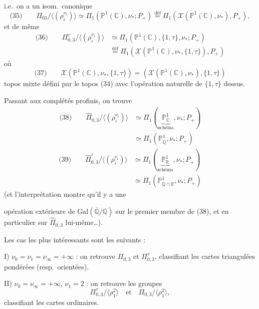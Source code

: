 \documentclass[11pt,a4paper]{article}
\begin{document}
i.e.\ on a un isom.\ canonique
\[
  \text{(35)} \qquad \Pi_{03} / \langle (\rho_i^{\nu_i}) \rangle \simeq
  \Pi_1(\mathbb{P}^1(\mathbb{C}), \nu_*; P_+) \overset{\text{déf}}{=}
  \Pi_1(\mathcal{X}(\mathbb{P}^1(\mathbb{C}), \nu_*), P_+) ,
\]
et de même
\[
  \begin{aligned}
  \text{(36)} \qquad \Pi_{0,3}^\tau / \langle (\rho_i^{\nu_i}) \rangle
  &\simeq \Pi_1(\mathbb{P}^1(\mathbb{C}), \{1, \tau\}, \nu_*; P_+) \\
  &\overset{\text{déf}}{=}
  \Pi_1(\mathcal{X}(\mathbb{P}^1(\mathbb{C}), \nu_*, \{1, \tau\}), P_+)
  \end{aligned}
\]
où
\[
  \text{(37)} \qquad \mathcal{X}(\mathbb{P}^1(\mathbb{C}), \nu_*, \{1, \tau\})
  = (\mathcal{X}(\mathbb{P}^1(\mathbb{C}), \nu_*), \{1, \tau\})
\]
topos mixte défini par le topos (34) avec l'opération naturelle de $\{1, \tau\}$
dessus.

Passant aux complétés profinis, on trouve
\[
  \begin{aligned}
  \text{(38)} \qquad \widehat{\Pi}_{0,3} / \langle (\rho_i^{\nu_i}) \rangle
  &\simeq \Pi_1(\underbrace{\mathbb{P}^1_{\mathbb{C}}}_{\text{schéma}}, \nu_*; P_+) \\
  &\simeq \Pi_1(\mathbb{P}^1_{\overline{\mathbb{Q}}}, \nu_*; P_+)
  \end{aligned}
\]
\[
  \begin{aligned}
  \text{(39)} \qquad \widehat{\Pi}_{0,3}^\tau / \langle (\rho_i^{\nu_i}) \rangle
  &\simeq \Pi_1(\underbrace{\mathbb{P}^1_{\mathbb{R}}}_{\text{schéma}}, \nu_*; P_+) \\
  &\simeq \Pi_1(\mathbb{P}^1_{\overline{\mathbb{Q}} \cap \mathbb{R}}, \nu_*; P_+)
  \end{aligned}
\]
(et \struck{\ill{}} l'interprétation  montre qu'il y a une

opération extérieure de $\mathrm{Gal}(\overline{\mathbb{Q}}/\mathbb{Q})$ sur le
premier membre de (38), et en particulier sur $\widehat{\Pi}_{0,3}$ lui-même…).

Les cas les plus intéressants sont les  suivants :

I) $\nu_0 = \nu_1 = \nu_\infty = +\infty$ : on retrouve $\Pi_{0,3}$ et
$\Pi_{0,3}^\tau$, classifiant les cartes triangulées pondérées (resp.\ orientées).

II) $\nu_0 = \nu_\infty = +\infty$, $\nu_1 = 2$ : on retrouve les groupes
\[
  \Pi_{0,3}^\tau / \langle \rho_1^2 \rangle \quad \text{et} \quad
  \Pi_{0,3} / \langle \rho_1^2 \rangle ,
\]
classifiant les cartes ordinaires.
\end{document}
